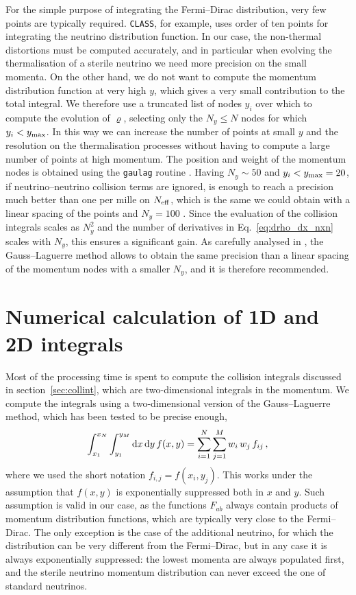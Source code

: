 \documentclass[notitlepage,nofootinbib,showpacs,preprintnumbers,amsmath,amssymb,superscriptaddress,prd,onecolumn]{revtex4-1}
\newcommand{\Neff}{\ensuremath{N_{\rm eff}}}
\begin{document}
For the simple purpose of integrating the Fermi--Dirac distribution, very few points are typically required.
\texttt{CLASS}, for example, uses order of ten points for integrating the neutrino distribution function.
In our case, the non-thermal distortions must be computed accurately, and in particular
when evolving the thermalisation of a sterile neutrino we need more precision on the small momenta.
On the other hand, we do not want to compute the momentum distribution function at very high $y$,
which gives a very small contribution to the total integral.
We therefore use a truncated list of nodes $y_i$ over which to compute the evolution of $\varrho$,
selecting only the $N_y\leq N$ nodes for which $y_i<y_{\rm max}$.
In this way we can increase the number of points at small $y$ and the resolution on the thermalisation processes
without having to compute a large number of points at high momentum.
The position and weight of the momentum nodes is obtained
using the \texttt{gaulag} routine \cite{NR}.
Having $N_y\sim50$ and $y_i<y_{\rm max}=20$,
if neutrino--neutrino collision terms are ignored,
is enough to reach a precision much better than one per mille on \Neff,
which is the same we could obtain with a linear spacing of the points
and $N_y=100$ \cite{deSalas:2016ztq}.
Since the evaluation of the collision integrals scales as $N_y^2$
and the number of derivatives in Eq.~\eqref{eq:drho_dx_nxn} scales with $N_y$,
this ensures a significant gain.
As carefully analysed in \cite{Bennett:2020zkv}, the Gauss--Laguerre method allows to obtain the same precision than a linear spacing of the momentum nodes with a smaller $N_y$, and it is therefore recommended.


\section{Numerical calculation of 1D and 2D integrals}
\label{ssec:integrals}
Most of the processing time is spent to compute the collision integrals
discussed in section~\ref{sec:collint}, which are two-dimensional integrals in the momentum.
We compute the integrals using a two-dimensional version of the Gauss--Laguerre method,
which has been tested to be precise enough,
%
\begin{equation}
\int_{x_1}^{x_N}\int_{y_1}^{y_M}{\rm d}x\, \mathrm{d}y\, f(x, y)
=
\sum_{i=1}^{N}\sum_{j=1}^{M}
w_i\,w_j\,f_{ij}
\,,
\end{equation}
where we used the short notation $f_{i,j} = f(x_i,y_j)$.
This works under the assumption that $f(x,y)$ is exponentially suppressed both in $x$ and $y$.
Such assumption is valid in our case, as the functions $F_{ab}$ always contain products of momentum distribution functions,
which are typically very close to the Fermi--Dirac.
The only exception is the case of the additional neutrino, for which the distribution can be very different from the Fermi--Dirac,
but in any case it is always exponentially suppressed:
the lowest momenta are always populated first,
and the sterile neutrino momentum distribution can never exceed the one of standard neutrinos.
\end{document}
